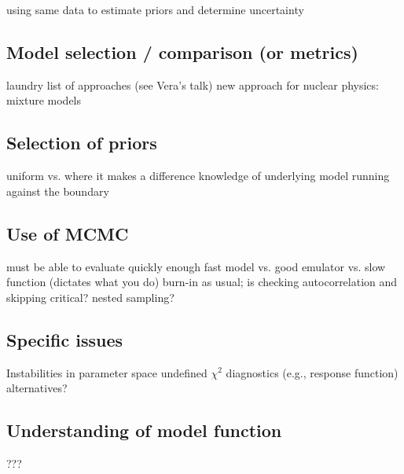   \bi
    \I using same data to estimate priors and determine uncertainty
  \ei


\subsection{Model selection / comparison (or metrics)}  \label{subsec:model_comparison}

  \bi
    \I laundry list of approaches (see Vera's talk)
    \I new approach for nuclear physics: mixture models
  \ei


\subsection{Selection of priors}  \label{subsec:selecting_priors}

  \bi
    \I uniform vs. where it makes a difference
    \I knowledge of underlying model 
    \I running against the boundary  
  \ei


\subsection{Use of MCMC}  \label{subsec:using_mcmc}

  \bi
    \I must be able to evaluate quickly enough
    \I fast model vs. good emulator vs. slow function (dictates what you do)
    \I burn-in as usual; is checking autocorrelation and skipping critical?
    \I nested sampling?
  \ei


\subsection{Specific issues}  \label{subsec:issues}

  \bi
    \I Instabilities in parameter space
      \bi
        \I undefined $\chi^2$
        \I diagnostics (e.g., response function) 
        \I alternatives?
      \ei     
  \ei


\subsection{Understanding of model function}  \label{subsec:model_function}

  \bi
    \I ???
  \ei



